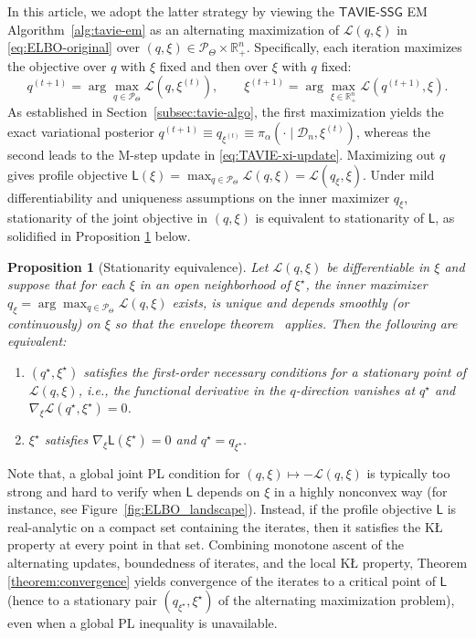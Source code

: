 \documentclass[12pt]{article}
\newtheorem{proposition}{Proposition}
\numberwithin{equation}{section}
\newcommand{\tssg}{\mathsf{TAVIE}\text{-}\mathsf{SSG}}
\begin{document}
In this article, we adopt the latter strategy by viewing the $\tssg$ EM Algorithm~\ref{alg:tavie-em} as an alternating maximization of $\mathcal L(q,\xi)$ in \eqref{eq:ELBO-original} over $(q, \xi) \in \mathcal{P}_{\Theta} \times \mathbb{R}^{n}_{+}$. Specifically, each iteration maximizes the objective over $q$ with $\xi$ fixed and then over $\xi$ with $q$ fixed:
\begin{equation*}
q^{(t+1)}
=
\arg\max_{q\in\mathcal P_\Theta}
\mathcal L(q,\xi^{(t)}),
\qquad
\xi^{(t+1)}
=
\arg\max_{\xi\in\mathbb R_+^n}
\mathcal L(q^{(t+1)},\xi).
\end{equation*}
As established in Section~\ref{subsec:tavie-algo}, the first maximization yields the exact variational posterior $q^{(t+1)} \equiv q_{\xi^{(t)}} \equiv \pi_{\alpha}(\cdot \mid \mathcal D_n, \xi^{(t)})$, whereas the second leads to the M-step update in \eqref{eq:TAVIE-xi-update}. Maximizing out $q$ gives profile objective $\mathsf{L}(\xi) =
\max_{q\in\mathcal P_\Theta}\mathcal L(q,\xi)
= \mathcal L(q_\xi,\xi)$. Under mild differentiability and uniqueness assumptions on the inner maximizer $q_\xi$, stationarity of the joint objective in $(q,\xi)$ is equivalent to stationarity of $\mathsf{L}$, as solidified in Proposition \ref{proposition:stationarity-equivalence} below.
%
\begin{proposition}[Stationarity equivalence]
\label{proposition:stationarity-equivalence}
Let $\mathcal L(q,\xi)$ be differentiable in $\xi$ and suppose that for each $\xi$ in an open neighborhood of $\xi^\star$, the inner maximizer $q_\xi=\arg\max_{q\in\mathcal{P}_{\Theta}}\mathcal L(q,\xi)$ exists, is unique and depends smoothly (or continuously) on $\xi$ so that the envelope theorem~\citep{Danskin1967} applies.  Then the following are equivalent:
\begin{enumerate}
  \item $(q^\star,\xi^\star)$ satisfies the first-order necessary conditions for a stationary point of $\mathcal L(q,\xi)$, i.e., the functional derivative in the $q$-direction vanishes at $q^\star$ and $\nabla_\xi\mathcal L(q^\star,\xi^\star)=0$.
  \item $\xi^\star$ satisfies $\nabla_{\xi} \mathsf{L}(\xi^\star)=0$ and $q^\star=q_{\xi^\star}$.
\end{enumerate}
\end{proposition}

Note that, a global joint PL condition for $(q,\xi)\mapsto -\mathcal L(q,\xi)$ is typically too strong and hard to verify when $\mathsf{L}$ depends on $\xi$ in a highly nonconvex way (for instance, see Figure~\ref{fig:ELBO_landscape}).
Instead, if the profile objective $\mathsf{L}$ is real-analytic on a compact set containing the iterates, then it satisfies the K\L{} property at every point in that set.  Combining monotone ascent of the alternating updates, boundedness of iterates, and the local K\L{} property, Theorem \ref{theorem:convergence} yields convergence of the iterates to a critical point of $\mathsf{L}$ (hence to a stationary pair $(q_{\xi^{\star}}, \xi^{\star})$ of the alternating maximization problem), even when a global PL inequality is unavailable.
\end{document}

